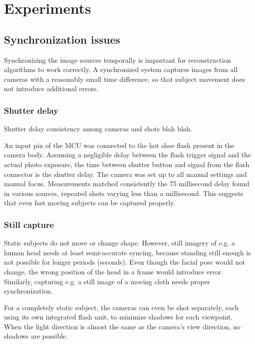 \section{Experiments}


\subsection{Synchronization issues}

Synchronizing the image sources temporally is important for reconstruction algorithms to work correctly.
A synchronized system captures images from all cameras with a reasonably small time difference, so that subject movement does not introduce additional errors.

\subsubsection{Shutter delay} \label{sec:shutterdelaymeas}

Shutter delay consistency among cameras and shots blah blah.

An input pin of the MCU was connected to the hot shoe flash present in the camera body.
Assuming a negligible delay between the flash trigger signal and the actual photo exposure, the time between shutter button and signal from the flash connector is the shutter delay.
The camera was set up to all manual settings and manual focus.
Measurements matched consistently the 75 millisecond delay found in various sources, repeated shots varying less than a millisecond.
This suggests that even fast moving subjects can be captured properly.

\subsubsection{Still capture}

Static subjects do not move or change shape.
However, still imagery of e.g. a human head needs at least semi-accurate syncing, because standing still enough is not possible for longer periods (seconds).
Even though the facial pose would not change, the wrong position of the head in a frame would introduce error.
Similarly, capturing e.g. a still image of a moving cloth needs proper synchronization.

For a completely static subject, the cameras can even be shot separately, each using its own integrated flash unit, to minimize shadows for each viewpoint.
When the light direction is almost the same as the camera's view direction, no shadows are possible.

